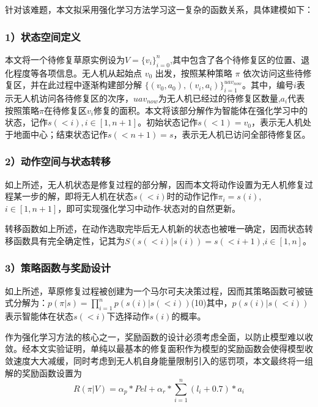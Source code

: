 \documentclass[AutoFakeBold]{LZUThesis}
\begin{document}
针对该难题，本文拟采用强化学习方法学习这一复杂的函数关系，具体建模如下：

\subsubsection{1）状态空间定义}

本文将一个待修复草原实例设为$V=\{v_i\}_{i=0}^n$,其中包含了各个待修复区的位置、退化程度等各项信息。无人机从起始点 $v_0$ 出发，按照某种策略 $\pi$ 依次访问这些待修复区，并在此过程中逐渐构建部分解 $\{(v_0,a_0),(v_i,a_i)\}_{i=1}^{uav_{now}}$。其中，编号$i$表示无人机访问各待修复区的次序，$uav_{now}$为无人机已经过的待修复区数量,$a_i$代表按照策略$\pi$在待修复区$v_i$修复的面积。本文将该部分解作为智能体在强化学习中的状态，记作$s(<i),i\in[1,n+1]$。初始状态记作$s(<1)=v_0$，表示无人机处于地面中心；结束状态记作$s(<n+1)=s$，表示无人机已访问全部待修复区。

\subsubsection{2）动作空间与状态转移}

如上所述，无人机状态是修复过程的部分解，因而本文将动作设置为无人机修复过程某一步的解，即将无人机在状态$s(<i)$时的动作记作$\pi_i=s(i)$,$i\in[1,n+1]$，即可实现强化学习中动作-状态对的自然更新。

转移函数如上所述，在动作选取完毕后无人机新的状态也被唯一确定，因而状态转移函数具有完全确定性，记其为$S(s(<i)|s(i))=s(<i+1)$,$i\in[1,n]$。

\subsubsection{3）策略函数与奖励设计}

如上所述，草原修复过程被创建为一个马尔可夫决策过程，因而其策略函数可被链式分解为：$p(\pi|s)=\prod_{i=1}^n p(s(i)|s(<i))$(10)其中，$p(s(i)|s(<i))$表示智能体在状态$s(<i)$下选择动作$s(i)$的概率。

作为强化学习方法的核心之一，奖励函数的设计必须考虑全面，以防止模型难以收敛。经本文实验证明，单纯以最基本的修复面积作为模型的奖励函数会使得模型收敛速度大大减缓，同时考虑到无人机自身能量限制引入的惩罚项，本文最终将一组解的奖励函数设置为
\begin{equation}
	R(\pi|V)=\alpha_{p}*Pel+\alpha_{r}*\sum_{i=1}^{n}(l_i+0.7)*a_{i}
	\label{eq:11}
\end{equation}
\end{document}
